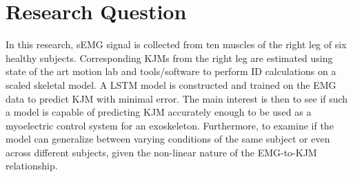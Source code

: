 \documentclass[../main.tex]{subfiles}
\begin{document}
\section{Research Question}
In this research, \ac{sEMG} signal is collected from ten muscles of the right leg of six healthy subjects. 
Corresponding \acp{KJM} from the right leg are estimated using state of the art motion lab and tools/software to perform \ac{ID} calculations on a scaled skeletal model.
A \ac{LSTM} model is constructed and trained on the \ac{EMG} data to predict \ac{KJM} with minimal error.
The main interest is then to see if such a model is capable of predicting \ac{KJM} accurately enough to be used as a myoelectric control system for an exoskeleton.
Furthermore, to examine if the model can generalize between varying conditions of the same subject or even across different subjects, given the non-linear nature of the \ac{EMG}-to-\ac{KJM} relationship.
\end{document}
